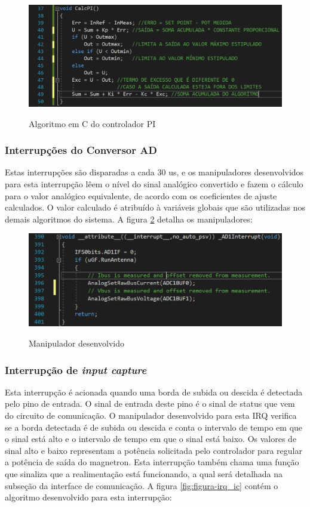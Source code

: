 \begin{figure}[H]
    \centering
    \caption{Algoritmo em C do controlador PI}
    \includegraphics[width=1\textwidth]{./dados/figuras/func_pi}
    \label{fig:figura-func-pi}
\end{figure}

\subsubsection{Interrupções do Conversor AD}
Estas interrupções são disparadas a cada 30 us, e os manipuladores desenvolvidos para esta interrupção lêem o nível do sinal analógico convertido e fazem o cálculo para o valor analógico equivalente, de acordo com os coeficientes de ajuste calculados. O valor calculado é atribuído à variáveis globais que são utilizadas nos demais algoritmos do sistema. A figura \ref{fig:figura-irq_ad} detalha os manipuladores:

\begin{figure}[H]
    \centering
    \caption{Manipulador desenvolvido}
    \includegraphics[width=1\textwidth]{./dados/figuras/irq_ad}
    \label{fig:figura-irq_ad}
\end{figure}


\subsubsection{Interrupção de \textit{input capture}}
Esta interrupção é acionada quando uma borda de subida ou descida é detectada pelo pino de entrada. O sinal de entrada deste pino é o sinal de status que vem do circuito de comunicação. O manipulador desenvolvido para esta IRQ verifica se a borda detectada é de subida ou descida e conta o intervalo de tempo em que o sinal está alto e o intervalo de tempo em que o sinal está baixo. Os valores de sinal alto e baixo representam a potência solicitada pelo controlador para regular a potência de saída do magnetron. Esta interrupção também chama uma função que sinaliza que a realimentação está funcionando, a qual será detalhada na subseção da interface de comunicação. A figura \ref{fig:figura-irq_ic} contém o algoritmo desenvolvido para esta interrupção:

